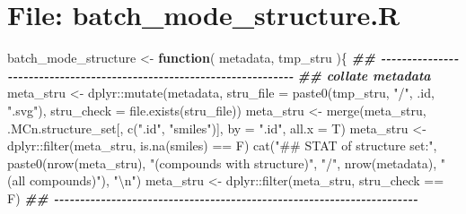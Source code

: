 \documentclass[
]{article}
\newenvironment{Shaded}{\begin{snugshade}}{\end{snugshade}}
\newcommand{\AttributeTok}[1]{\textcolor[rgb]{0.77,0.63,0.00}{#1}}
\newcommand{\ControlFlowTok}[1]{\textcolor[rgb]{0.13,0.29,0.53}{\textbf{#1}}}
\newcommand{\DocumentationTok}[1]{\textcolor[rgb]{0.56,0.35,0.01}{\textbf{\textit{#1}}}}
\newcommand{\FunctionTok}[1]{\textcolor[rgb]{0.00,0.00,0.00}{#1}}
\newcommand{\NormalTok}[1]{#1}
\newcommand{\OtherTok}[1]{\textcolor[rgb]{0.56,0.35,0.01}{#1}}
\newcommand{\SpecialCharTok}[1]{\textcolor[rgb]{0.00,0.00,0.00}{#1}}
\newcommand{\StringTok}[1]{\textcolor[rgb]{0.31,0.60,0.02}{#1}}
\begin{document}
\hypertarget{file-batch_mode_structure.r}{%
\section{File: batch\_mode\_structure.R}\label{file-batch_mode_structure.r}}

\begin{Shaded}
\begin{Highlighting}[]
\NormalTok{batch\_mode\_structure }\OtherTok{\textless{}{-}}
  \ControlFlowTok{function}\NormalTok{(}
\NormalTok{           metadata,}
\NormalTok{           tmp\_stru}
\NormalTok{           )\{}
    \DocumentationTok{\#\# {-}{-}{-}{-}{-}{-}{-}{-}{-}{-}{-}{-}{-}{-}{-}{-}{-}{-}{-}{-}{-}{-}{-}{-}{-}{-}{-}{-}{-}{-}{-}{-}{-}{-}{-}{-}{-}{-}{-}{-}{-}{-}{-}{-}{-}{-}{-}{-}{-}{-}{-}{-}{-}{-}{-}{-}{-}{-}{-}{-}{-}{-}{-}{-}{-}{-}{-}{-}{-}{-} }
    \DocumentationTok{\#\# collate metadata}
\NormalTok{    meta\_stru }\OtherTok{\textless{}{-}}\NormalTok{ dplyr}\SpecialCharTok{::}\FunctionTok{mutate}\NormalTok{(metadata,}
                               \AttributeTok{stru\_file =} \FunctionTok{paste0}\NormalTok{(tmp\_stru, }\StringTok{"/"}\NormalTok{, .id, }\StringTok{".svg"}\NormalTok{),}
                               \AttributeTok{stru\_check =} \FunctionTok{file.exists}\NormalTok{(stru\_file))}
\NormalTok{    meta\_stru }\OtherTok{\textless{}{-}} \FunctionTok{merge}\NormalTok{(meta\_stru, .MCn.structure\_set[, }\FunctionTok{c}\NormalTok{(}\StringTok{".id"}\NormalTok{, }\StringTok{"smiles"}\NormalTok{)], }\AttributeTok{by =} \StringTok{".id"}\NormalTok{, }\AttributeTok{all.x =}\NormalTok{ T)}
\NormalTok{    meta\_stru }\OtherTok{\textless{}{-}}\NormalTok{ dplyr}\SpecialCharTok{::}\FunctionTok{filter}\NormalTok{(meta\_stru, }\FunctionTok{is.na}\NormalTok{(smiles) }\SpecialCharTok{==}\NormalTok{ F)}
    \FunctionTok{cat}\NormalTok{(}\StringTok{"\#\# STAT of structure set:"}\NormalTok{,}
        \FunctionTok{paste0}\NormalTok{(}\FunctionTok{nrow}\NormalTok{(meta\_stru), }\StringTok{"(compounds with structure)"}\NormalTok{, }\StringTok{"/"}\NormalTok{, }\FunctionTok{nrow}\NormalTok{(metadata), }\StringTok{"(all compounds)"}\NormalTok{),}
        \StringTok{"}\SpecialCharTok{\textbackslash{}n}\StringTok{"}\NormalTok{)}
\NormalTok{    meta\_stru }\OtherTok{\textless{}{-}}\NormalTok{ dplyr}\SpecialCharTok{::}\FunctionTok{filter}\NormalTok{(meta\_stru, stru\_check }\SpecialCharTok{==}\NormalTok{ F)}
    \DocumentationTok{\#\# {-}{-}{-}{-}{-}{-}{-}{-}{-}{-}{-}{-}{-}{-}{-}{-}{-}{-}{-}{-}{-}{-}{-}{-}{-}{-}{-}{-}{-}{-}{-}{-}{-}{-}{-}{-}{-}{-}{-}{-}{-}{-}{-}{-}{-}{-}{-}{-}{-}{-}{-}{-}{-}{-}{-}{-}{-}{-}{-}{-}{-}{-}{-}{-}{-}{-}{-}{-}{-}{-} }

\end{Highlighting}
\end{Shaded}
\end{document}
